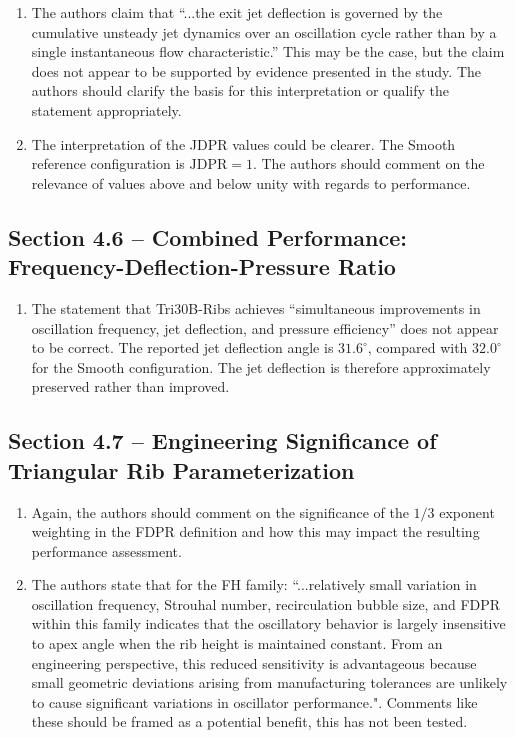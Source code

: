 \documentclass[11pt]{article}
\begin{document}
	\begin{enumerate}
		\item The authors claim that ``...the exit jet deflection is governed by the cumulative unsteady jet dynamics over an oscillation cycle rather than by a single instantaneous flow characteristic.'' This may be the case, but the claim does not appear to be supported by evidence presented in the study. The authors should clarify the basis for this interpretation or qualify the statement appropriately.
		
		\item The interpretation of the JDPR values could be clearer. The Smooth reference configuration is $\mathrm{JDPR}=1$. The authors should comment on the relevance of values above and below unity with regards to performance.
	\end{enumerate}
	
	\subsection*{Section 4.6 -- Combined Performance: Frequency-Deflection-Pressure Ratio}
	
	\begin{enumerate}
		\item The statement that Tri30B-Ribs achieves ``simultaneous improvements in oscillation frequency, jet deflection, and pressure efficiency'' does not appear to be correct. The reported jet deflection angle is $31.6^\circ$, compared with $32.0^\circ$ for the Smooth configuration. The jet deflection is therefore approximately preserved rather than improved. 
	\end{enumerate}
	
	\subsection*{Section 4.7 -- Engineering Significance of Triangular Rib Parameterization}
	
	\begin{enumerate}
		\item Again, the authors should comment on the significance of the $1/3$ exponent weighting in the FDPR definition and how this may impact the resulting performance assessment.
		
		\item The authors state that for the FH family: ``...relatively small variation in oscillation frequency, Strouhal number, recirculation bubble size, and FDPR within this family indicates that the oscillatory behavior is largely insensitive to apex angle when the rib height is maintained constant. From an engineering perspective, this reduced sensitivity is advantageous because small geometric deviations arising from manufacturing tolerances are unlikely to cause significant variations in oscillator performance.". Comments like these should be framed as a potential benefit, this has not been tested.
	\end{enumerate}
	
\end{document}
